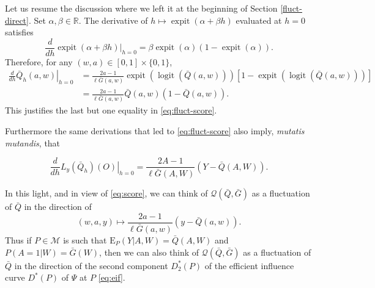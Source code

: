 \documentclass[
  11pt,
  openright,twoside]{book}
\DeclareMathOperator{\expit}{expit}
\DeclareMathOperator{\logit}{logit}
\newcommand{\bbR}{\mathbb{R}}
\newcommand{\calM}{\mathcal{M}}
\newcommand{\calQ}{\mathcal{Q}}
\newcommand{\Exp}{\textrm{E}}
\newcommand{\Gbar}{\bar{G}}
\newcommand{\Qbar}{\bar{Q}}
\theoremstyle{definition}
\theoremstyle{definition}
\theoremstyle{definition}
\theoremstyle{definition}
\theoremstyle{remark}
\begin{document}
Let us resume the discussion where we left it at the beginning of Section
\ref{fluct-direct}. Set \(\alpha, \beta \in \bbR\). The derivative of \(h \mapsto \expit(\alpha + \beta h)\) evaluated at \(h=0\) satisfies
\begin{equation*}\frac{d}{dh}  \left.\expit(\alpha +  \beta h)\right|_{h=0}  =
\beta \expit(\alpha)  (1 - \expit(\alpha)).\end{equation*} Therefore, for any
\((w,a) \in [0,1] \times \{0,1\}\),
\begin{align*}\frac{d}{dh} \left.\Qbar_{h} (a, w)\right|_{h=0} &= \frac{2a - 1}{\ell\Gbar(a,w)} \expit\left(\logit\left(\Qbar(a,w)\right)\right) \left[1 - \expit\left(\logit\left(\Qbar(a,w)\right)\right)\right]\\&= \frac{2a - 1}{\ell\Gbar(a,w)} \Qbar(a,w) \left(1 - \Qbar(a,w)\right).\end{align*}
This justifies the last but one equality in \eqref{eq:fluct-score}.

Furthermore the same derivations that led to \eqref{eq:fluct-score} also imply,
\emph{mutatis mutandis}, that

\begin{equation*}  \frac{d}{d  h} \left.   L_{y}(\Qbar_{h})(O)\right|_{h=0}  =
\frac{2A      -      1}{\ell\Gbar(A,      W)}     \left(Y      -      \Qbar(A,
W)\right). \label{eq:fluct-score-bis}\end{equation*}

In this light, and in view of \eqref{eq:score}, we can think of \(\calQ(\Qbar, \Gbar)\) as a fluctuation of \(\Qbar\) in the direction of \begin{equation*}(w,a,y)     \mapsto    \frac{2a-1}{\ell\Gbar(a,w)}     (y     -
\Qbar(a,w)).\end{equation*} Thus if \(P \in \calM\) is such that
\(\Exp_{P}(Y|A,W) = \Qbar(A,W)\) and \(P(A=1|W) = \Gbar(W)\), then we can also
think of \(\calQ(\Qbar, \Gbar)\) as a fluctuation of \(\Qbar\) in the direction of
the second component \(D_{2}^{*}(P)\) of the efficient influence curve
\(D^{*}(P)\) of \(\Psi\) at \(P\) \eqref{eq:eif}.

  

\printindex
\end{document}
